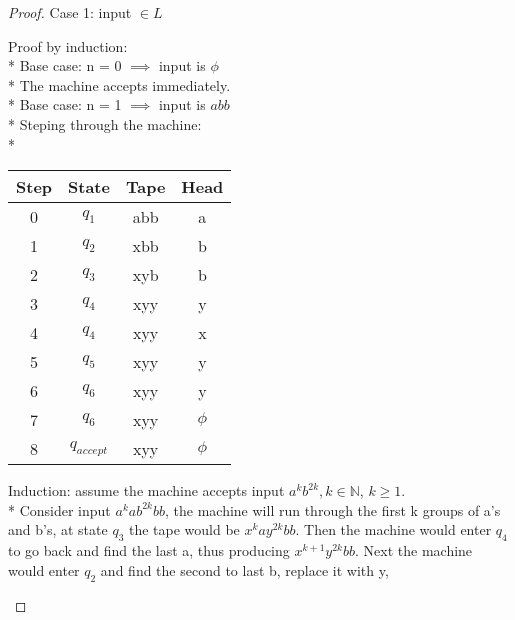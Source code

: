 \documentclass{article}
\begin{document}
\begin{multicols}{2}

    \begin{proof}
        Case 1: input $\in L$
        \begin{addmargin}[1em]{0em}
            Proof by induction:\\*
            Base case: n = 0 $\implies$ input is $\phi$\\*
            The machine accepts immediately.\\*
            Base case: n = 1 $\implies$ input is $abb$ \\*
            Steping through the machine: \\*
            \begin{center}
                \centering
                \begin{tabular}{ |c|c|c|c| }
                    \hline
                    Step & State        & Tape & Head   \\
                    \hline
                    0    & $q_1$        & abb  & a      \\
                    1    & $q_2$        & xbb  & b      \\
                    2    & $q_3$        & xyb  & b      \\
                    3    & $q_4$        & xyy  & y      \\
                    4    & $q_4$        & xyy  & x      \\
                    5    & $q_5$        & xyy  & y      \\
                    6    & $q_6$        & xyy  & y      \\
                    7    & $q_6$        & xyy  & $\phi$ \\
                    8    & $q_{accept}$ & xyy  & $\phi$ \\
                    \hline
                \end{tabular}
            \end{center}
            Induction: assume the machine accepts input $a^kb^{2k}, k \in \mathbb{N}$,
            $k\geq1$. \\*
            Consider input $a^kab^{2k}bb$, the machine will run through the first k groups of
            a's and b's, at state $q_3$ the tape would be $x^kay^{2k}bb$. Then the machine
            would enter $q_4$ to go back and find the last a, thus producing $x^{k+1}y^{2k}bb$.
            Next the machine would enter $q_2$ and find the second to last b, replace it with y,

\end{addmargin}
\end{proof}
\end{multicols}
\end{document}
